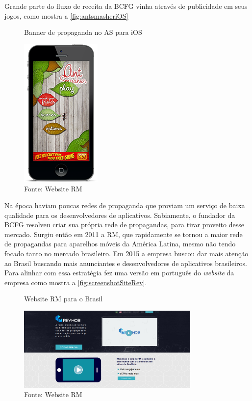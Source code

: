 Grande parte do fluxo de receita da BCFG vinha através de publicidade em seus jogos, como mostra a \autoref{fig:antsmasheriOS}
\begin{figure}[H]
\caption{Banner de propaganda no AS para iOS}
\centerline{\includegraphics[scale=0.5]{img/antsmasheriOS}}
\label{fig:antsmasheriOS}
\caption* {Fonte: Website RM}
\end{figure}

Na época haviam poucas redes de propaganda que proviam um serviço de baixa qualidade para os desenvolvedores de aplicativos. Sabiamente, o fundador da BCFG resolveu criar sua própria rede de propagandas, para tirar proveito desse mercado. Surgiu então em 2011 a RM, que rapidamente se tornou a maior rede de propagandas para aparelhos móveis da América Latina, mesmo não tendo focado tanto no mercado brasileiro. Em 2015 a empresa buscou dar mais atenção ao Brasil buscando mais anunciantes e desenvolvedores de aplicativos brasileiros. Para alinhar com essa estratégia fez uma versão em português do \textit{website} da empresa como mostra a \autoref{fig:screenshotSiteRev}.

\begin{figure}[H]
\caption{Website RM para o Brasil}
\centerline{\includegraphics[width=0.8\textwidth]{img/screenshotSiteRev}}
\label{fig:screenshotSiteRev}
\caption* {Fonte: Website RM}
\end{figure}

